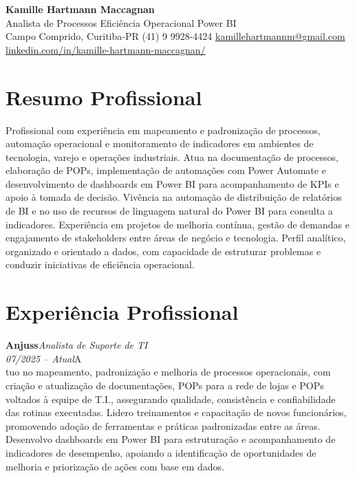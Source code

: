 \documentclass[11pt,a4paper]{article}
\newcommand{\cvrole}[4]{%
  \vspace{4pt}%
  {\bfseries\color{accentcolor}#1}\hfill{\itshape #2}\\[-2pt]%
  {\itshape #3}\hfill #4\\[6pt]%
}
\begin{document}
\begin{center}
  {\fontsize{20}{24}\selectfont\bfseries Kamille Hartmann Maccagnan}\\[8pt]
  {\large Analista de Processos \textbar{} Eficiência Operacional \textbar{} Power BI}\\[10pt]
  Campo Comprido, Curitiba-PR \enspace\textbullet\enspace (41) 9 9928-4424 \enspace\textbullet\enspace
  \href{mailto:kamillehartmannm@gmail.com}{kamillehartmannm@gmail.com}\\[3pt]
  \href{https://linkedin.com/in/kamille-hartmann-maccagnan/}{linkedin.com/in/kamille-hartmann-maccagnan/}
\end{center}

\vspace{6pt}

\section{Resumo Profissional}

Profissional com experiência em mapeamento e padronização de processos, automação operacional e monitoramento de indicadores em ambientes de tecnologia, varejo e operações industriais. Atua na documentação de processos, elaboração de POPs, implementação de automações com Power Automate e desenvolvimento de dashboards em Power BI para acompanhamento de KPIs e apoio à tomada de decisão. Vivência na automação de distribuição de relatórios de BI e no uso de recursos de linguagem natural do Power BI para consulta a indicadores. Experiência em projetos de melhoria contínua, gestão de demandas e engajamento de stakeholders entre áreas de negócio e tecnologia. Perfil analítico, organizado e orientado a dados, com capacidade de estruturar problemas e conduzir iniciativas de eficiência operacional.

\section{Experiência Profissional}

\cvrole{Anjuss}{Analista de Suporte de TI}{07/2025 -- Atual}

Atuo no mapeamento, padronização e melhoria de processos operacionais, com criação e atualização de documentações, POPs para a rede de lojas e POPs voltados à equipe de T.I., assegurando qualidade, consistência e confiabilidade das rotinas executadas. Lidero treinamentos e capacitação de novos funcionários, promovendo adoção de ferramentas e práticas padronizadas entre as áreas. Desenvolvo dashboards em Power BI para estruturação e acompanhamento de indicadores de desempenho, apoiando a identificação de oportunidades de melhoria e priorização de ações com base em dados.
\end{document}

